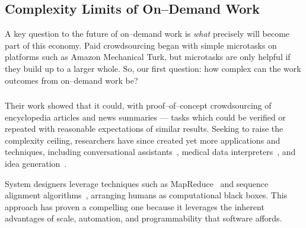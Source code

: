 \documentclass[pn4226]{subfiles}
\begin{document}
\begin{comment}
Crowdwork
  - Kittur said let's do complex stuff
  - This works by using CS techniques
  - Clear that this works in focused cases
  - More recent shift toward using experts
\end{comment}

\subsection[What are the complexity limits of on--demand work]
{Complexity Limits of On--Demand Work}\label{sec:complexity}
A key question to the future of on--demand work is
\textit{what} precisely will become part of this economy.
Paid crowdsourcing began with simple microtasks on platforms such as
Amazon Mechanical Turk, but
microtasks are only helpful if they build up to a larger whole.
So, our first question:
how complex can the work outcomes from on--demand work be?

\subsubsection{\crowdworkpers}
Their work showed that it could, with proof--of--concept crowdsourcing of
encyclopedia articles and news summaries
--- tasks which could be verified or repeated
with reasonable expectations of similar results.
Seeking to raise the complexity ceiling,
researchers have since created
yet more applications and techniques,
including conversational assistants~\cite{lasecki2013chorus},
medical data interpreters~\cite{lasecki2013chorus}, and
idea generation~\cite{YuEncouragingOutside,yu2014distributed,Yu2016a}.

System designers leverage techniques such as MapReduce~\cite{crowdForgeKittur} and
sequence alignment algorithms~\cite{lasecki2012real}, arranging humans as computational black boxes.
This approach has proven a compelling one because
it leverages the inherent advantages of
scale,
automation, and
programmability that software affords.
\end{document}
